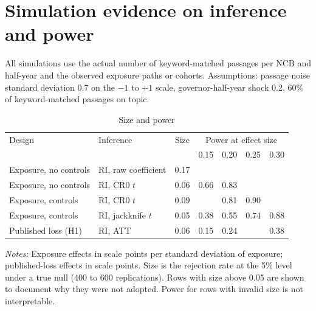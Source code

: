 \documentclass[11pt]{article}
\theoremstyle{plain}
\begin{document}
\section{Simulation evidence on inference and power}\label{app:sim}
All simulations use the actual number of keyword-matched passages per NCB and half-year and the observed exposure paths or cohorts. Assumptions: passage noise standard deviation 0.7 on the $-1$ to $+1$ scale, governor-half-year shock 0.2, 60\% of keyword-matched passages on topic.

\begin{table}[h]\centering\small
\begin{threeparttable}
\caption{Size and power}\label{tab:sim}
\begin{tabular}{llccccc}
\toprule
Design & Inference & Size & \multicolumn{4}{c}{Power at effect size} \\
 & & & 0.15 & 0.20 & 0.25 & 0.30 \\
\midrule
Exposure, no controls & RI, raw coefficient & 0.17 & & & & \\
Exposure, no controls & RI, CR0 $t$ & 0.06 & 0.66 & 0.83 & & \\
Exposure, controls & RI, CR0 $t$ & 0.09 & & 0.81 & 0.90 & \\
Exposure, controls & RI, jackknife $t$ & 0.05 & 0.38 & 0.55 & 0.74 & 0.88 \\
Published loss (H1) & RI, ATT & 0.06 & 0.15 & 0.24 & & 0.38 \\
\bottomrule
\end{tabular}
\begin{tablenotes}\footnotesize
\item \textit{Notes:} Exposure effects in scale points per standard deviation of exposure; published-loss effects in scale points. Size is the rejection rate at the 5\% level under a true null (400 to 600 replications). Rows with size above 0.05 are shown to document why they were not adopted. Power for rows with invalid size is not interpretable.
\end{tablenotes}
\end{threeparttable}
\end{table}
\end{document}
